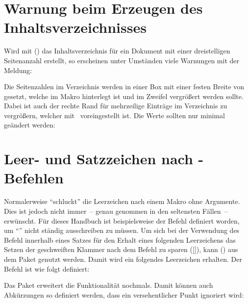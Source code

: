 \section{Warnung beim Erzeugen des Inhaltsverzeichnisses}
%
%
Wird mit () das Inhaltsverzeichnis 
für ein Dokument mit einer dreistelligen Seitenanzahl erstellt, so erscheinen 
unter Umständen viele Warnungen mit der Meldung:
%
\begin{quoting}
\end{quoting}
%
Die Seitenzahlen im Verzeichnis werden in einer Box mit einer festen Breite 
von~\PValue{1.55em} gesetzt, welche im Makro  hinterlegt ist 
und im Zweifel vergrößert werden sollte. Dabei ist auch der rechte Rand für 
mehrzeilige Einträge im Verzeichnis  zu vergrößern, welcher 
mit~\PValue{2.55em} voreingestellt ist. Die Werte sollten nur minimal geändert 
werden:
%
\begin{quoting}
\begin{Code}
\makeatletter
\renewcommand*{\@pnumwidth}{1.7em}\renewcommand*{\@tocrmarg}{2.7em}
\makeatother
\end{Code}
\end{quoting}



\section{Leer- und Satzzeichen nach -Befehlen}%
%
%
%
Normalerweise \enquote{schluckt}  die Leerzeichen nach einem 
Makro ohne Argumente. Dies ist jedoch nicht immer~-- genau genommen in den 
seltensten Fällen~-- erwünscht. Für dieses Handbuch ist beispielsweise der 
Befehl  definiert worden, um \enquote{\TUD{}} nicht ständig 
ausschreiben zu müssen. Um sich bei der Verwendung des Befehl innerhalb eines 
Satzes für den Erhalt eines folgenden Leerzeichens das Setzen der geschweiften 
Klammer nach dem Befehl zu sparen ([\PParameter{}]), kann 
() aus dem Paket  genutzt werden. 
Damit wird ein folgendes Leerzeichen erhalten. Der Befehl  ist wie 
folgt definiert:
%
\begin{quoting}
\begin{Code}
\newcommand*{\TUD}{Technische Universit\"at Dresden\xspace}
\end{Code}
\end{quoting}
%
Das Paket  erweitert die Funktionalität nochmals. Damit 
können auch Abkürzungen so definiert werden, dass ein versehentlicher Punkt 
ignoriert wird:
%
\begin{quoting}
\begin{Code}
\newcommand*{\zB}{z.\,B\xperiod}
\end{Code}
\end{quoting}



